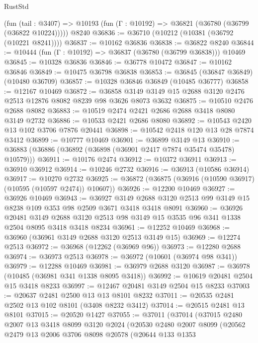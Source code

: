 \begin{lexlean}{RustStd}
\begin{coremodule}
    (fun (tail : @3407) => @10193 (fun (Γ : @10192) => @36821 (@36780 (@36799 (@36822 @10224)))))
    @8240
@36836 := @36710 (@10212 (@10381 (@36792 (@10221 @8241))))
@36837 := @10162 @36836
@36838 := @36822 @8240
@36844 := @10444 (fun (Γ : @10192) => @36837 (@36780 (@36799 @36838))) @10469
@36845 := @10328 @36836
@36846 := @36778 @10472
@36847 := @10162 @36846
@36849 := @10475 @36798 @36838
@36853 := @36845 (@36847 @36849) (@10480 @36709)
@36857 := @10328 @36846 @36849 (@10485 @36777)
@36858 := @12167 @10469
@36872 := @36858 @3149 @3149 @15 @2688 @3120 @2476 @2513 @12876 @8082 @8239 @98 @3626 @8073 @3632
@36875 := @10510 @2476 @2688 @8082
@36883 := @10519 @2474 @2421 @2686 @2688 @3418 @8080 @3149 @2732
@36886 := @10533 @2421 @2686 @8080
@36892 := @10543 @2420 @13 @102 @3706 @7876 @20441
@36898 := @10542 @2418 @120 @13 @28 @7874 @3412
@36899 := @10777 @10469
@36901 := @36899 @3149 @13
@36910 := @36883 (@36886 (@36892 (@36898 (@36901 @2417 @7874 @35474 @35478) @10579)))
@36911 := @10176 @2474
@36912 := @10372 @36911
@36913 := @36910 @36912
@36914 := @10246 @2732
@36916 := @36913 (@10586 @36914)
@36917 := @10270 @2732
@36925 := @36872 (@36875 (@36916 (@10590 @36917) (@10595 (@10597 @2474)) @10607))
@36926 := @12200 @10469
@36927 := @36926 @10469
@36943 := @36927
    @3149
    @2688
    @3120
    @2513
    @99
    @3149
    @15
    @8238
    @109
    @353
    @98
    @2509
    @3671
    @3418
    @3418
    @8091
@36960 := @36926
    @20481
    @3149
    @2688
    @3120
    @2513
    @98
    @3149
    @15
    @3535
    @96
    @341
    @1338
    @2504
    @8095
    @3418
    @3418
    @8234
@36961 := @12252 @10469
@36968 := @36960 (@36961 @3149 @2688 @3120 @2513 @3149 @15)
@36969 := @12274 @2513
@36972 := @36968 (@12262 (@36969 @96))
@36973 := @12280 @2688
@36974 := @36973 @2513
@36978 := @36972 (@10601 (@36974 @98 @341))
@36979 := @12288 @10469
@36981 := @36979 @2688 @3120
@36987 := @36978 (@10485 (@36981 @341 @1338 @8095 @3418))
@36992 := @10619 @20481 @2504 @15 @3418 @8233
@36997 := @12467 @20481 @3149 @2504 @15 @8233
@37003 := @20637 @2481 @2500 @13 @13 @8101 @8232
@37011 := @20535 @2481 @2502 @13 @102 @8101 (@3408 @8232 @3412)
@37014 := @20515 @2481 @13 @8101
@37015 := @20520 @1427
@37055 := @37011
    (@37014
      (@37015
        @2480
        @2007
        @13
        @3418
        @8099
        @3120
        @2024
        (@20530
          @2480
          @2007
          @8099
          (@20562
            @2479
            @13
            @2006
            @3706
            @8098
            @20578
            (@20644
              @133
              @1353

\end{coremodule}
\end{lexlean}
